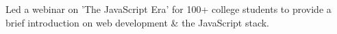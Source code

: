 \documentclass[]{ayush-gupta-resume-openfont}
\begin{document}
\begin{minipage}[t]{0.62\textwidth}
Led a webinar on 'The JavaScript Era' for 100+ college students to provide a brief introduction on web development \& the JavaScript stack. \\
\sectionsep

\sectionsep


% 
% 

\end{minipage} 
\end{document}
